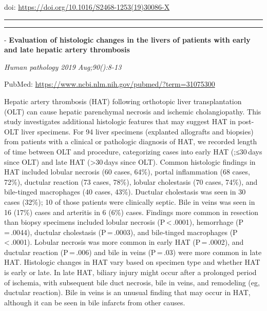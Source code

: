 \documentclass[]{article}
\begin{document}
doi: \url{https://doi.org/10.1016/S2468-1253(19)30086-X}

{}

{}

\begin{center}\rule{0.5\linewidth}{\linethickness}\end{center}

\begin{center}\rule{0.5\linewidth}{\linethickness}\end{center}

 - \textbf{Evaluation of histologic changes in the livers of patients
with early and late hepatic artery thrombosis}

\emph{Human pathology 2019 Aug;90():8-13}

PubMed: \url{https://www.ncbi.nlm.nih.gov/pubmed/?term=31075300}

Hepatic artery thrombosis (HAT) following orthotopic liver
transplantation (OLT) can cause hepatic parenchymal necrosis and
ischemic cholangiopathy. This study investigates additional histologic
features that may suggest HAT in post-OLT liver specimens. For 94 liver
specimens (explanted allografts and biopsies) from patients with a
clinical or pathologic diagnosis of HAT, we recorded length of time
between OLT and procedure, categorizing cases into early HAT (;≤30\,days
since OLT) and late HAT (\textgreater{}30\,days since OLT). Common
histologic findings in HAT included lobular necrosis (60 cases, 64\%),
portal inflammation (68 cases, 72\%), ductular reaction (73 cases,
78\%), lobular cholestasis (70 cases, 74\%), and bile-tinged macrophages
(40 cases, 43\%). Ductular cholestasis was seen in 30 cases (32\%); 10
of those patients were clinically septic. Bile in veins was seen in 16
(17\%) cases and arteritis in 6 (6\%) cases. Findings more common in
resection than biopsy specimens included lobular necrosis
(P\,\textless{}\,.0001), hemorrhage (P\,=\,.0044), ductular cholestasis
(P\,=\,.0003), and bile-tinged macrophages (P\,\textless{}\,.0001).
Lobular necrosis was more common in early HAT (P\,=\,.0002), and
ductular reaction (P\,=\,.006) and bile in veins (P\,=\,.03) were more
common in late HAT. Histologic changes in HAT vary based on specimen
type and whether HAT is early or late. In late HAT, biliary injury might
occur after a prolonged period of ischemia, with subsequent bile duct
necrosis, bile in veins, and remodeling (eg, ductular reaction). Bile in
veins is an unusual finding that may occur in HAT, although it can be
seen in bile infarcts from other causes.
\end{document}
